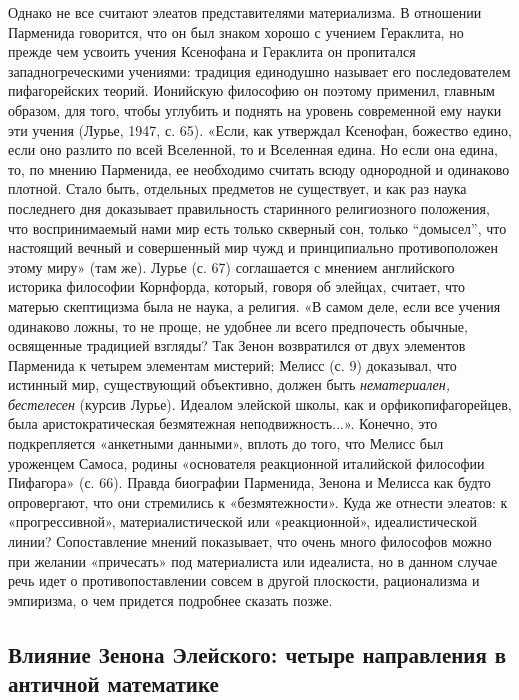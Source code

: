 Однако  не   все  считают  элеатов  представителями   материализма.  В
отношении  Парменида говорится,  что он  был знаком  хорошо с  учением
Гераклита,  но прежде  чем  усвоить учения  Ксенофана  и Гераклита  он
пропитался  западногреческими учениями:  традиция единодушно  называет
его  последователем  пифагорейских   теорий.  Ионийскую  философию  он
поэтому применил, главным образом, для  того, чтобы углубить и поднять
на  уровень современной  ему науки  эти учения  (Лурье, 1947,  с. 65).
«Если, как  утверждал Ксенофан,  божество едино,  если оно  разлито по
всей  Вселенной, то  и  Вселенная едина.  Но если  она  едина, то,  по
мнению Парменида,  ее необходимо считать всюду  однородной и одинаково
плотной.  Стало быть,  отдельных предметов  не существует,  и как  раз
наука последнего  дня доказывает правильность  старинного религиозного
положения,  что  воспринимаемый нами  мир  есть  только скверный  сон,
только  ``домысел'',  что  настоящий  вечный и  совершенный  мир  чужд
и  принципиально  противоположен  этому  миру»  (там  же).  Лурье  (с.
67) соглашается  с мнением  английского историка  философии Корнфорда,
который, говоря об элейцах, считает,  что матерью скептицизма была не
наука,  а религия.  «В самом  деле, если  все учения  одинаково ложны,
то  не проще,  не  удобнее ли  всего  предпочесть обычные,  освященные
традицией взгляды? Так Зенон возвратился от двух элементов Парменида к
четырем элементам мистерий; Мелисс (с. 9) доказывал, что истинный мир,
существующий объективно,  должен быть  \emph{нематериален, бестелесен}
(курсив  Лурье). Идеалом  элейской  школы,  как и  орфикопифагорейцев,
была  аристократическая  безмятежная неподвижность...».  Конечно,  это
подкрепляется  «анкетными данными»,  вплоть  до того,  что Мелисс  был
уроженцем Самоса, родины  «основателя реакционной италийской философии
Пифагора»  (с.  66).  Правда  биографии Парменида,  Зенона  и  Мелисса
как  будто   опровергают,  что   они  стремились   к  «безмятежности».
Куда  же   отнести  элеатов:  к   «прогрессивной»,  материалистической
или   «реакционной»,  идеалистической   линии?  Сопоставление   мнений
показывает, что  очень много  философов можно при  желании «причесать»
под  материалиста  или  идеалиста,  но   в  данном  случае  речь  идет
о  противопоставлении  совсем  в   другой  плоскости,  рационализма  и
эмпиризма, о чем придется подробнее сказать позже.

\subsection{Влияние  Зенона Элейского:  четыре направления  в античной
математике}

